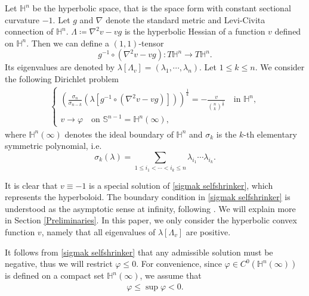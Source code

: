 \documentclass[reqno]{amsart}
\theoremstyle{remark}
\theoremstyle{definition}
\numberwithin{equation}{section}
\begin{document}
Let $\mathbb{H}^n$ be the hyperbolic space, that is the space form with constant sectional curvature $-1$. Let $g$ and $\nabla$ denote the standard metric and Levi-Civita connection of $\mathbb{H}^n$. $\Lambda \coloneqq \nabla^2 v - vg$ is the hyperbolic Hessian of a function $v$ defined on $\mathbb{H}^n$. Then we can define a $(1,1)$-tensor
\[
g^{-1} \circ \left( \nabla^2 v - vg \right) : T\mathbb{H}^n \to T\mathbb{H}^n. 
\]
Its eigenvalues are denoted by $\lambda \left[ \Lambda_v \right] = (\lambda_1, \cdots, \lambda_n)$. Let $1 \leqslant k \leqslant n$.
We consider the following Dirichlet problem
\begin{align}
  \begin{cases}
      \left( \frac{\sigma_n}{\sigma_{n-k}} \left( \lambda \left[ g^{-1} \circ \left( \nabla^2 v - vg \right) \right] \right) \right)^{\frac{1}{k}} = -\frac{v}{\binom{n}{k}^{\frac{1}{k}}} \quad \text{in } \mathbb{H}^{n}, \\
      v \rightarrow \varphi \quad \text{on } \mathbb{S}^{n-1}=\mathbb{H}^{n}(\infty), \label{sigmak selfshrinker}
  \end{cases}
\end{align}
where $\mathbb{H}^n(\infty)$ denotes the ideal boundary of $\mathbb{H}^n$ and $\sigma_k$ is the $k$-th elementary symmetric polynomial, i.e.
\[
\sigma_k(\lambda) = \sum_{1 \leqslant i_1 < \cdots < i_k \leqslant n} \lambda_{i_1}\cdots \lambda_{i_k}.
\]

It is clear that $v \equiv -1$ is a special solution of \eqref{sigmak selfshrinker}, which represents the hyperboloid. The boundary condition in \eqref{sigmak selfshrinker} is understood as the asymptotic sense at infinity, following \cite{Choi}. We will explain more in Section \ref{Preliminaries}. In this paper, we only consider the hyperbolic convex function $v$, namely that all eigenvalues of $\lambda[\Lambda_v]$ are positive. 

It follows from \eqref{sigmak selfshrinker} that any admissible
solution must be negative, thus we will restrict $\varphi \leqslant 0$. For convenience, since $\varphi \in C^{0}(\mathbb{H}^{n}(\infty))$ is defined on a compact set $\mathbb{H}^{n}(\infty)$, we assume that 
\begin{align}
    \varphi \leqslant \sup \varphi < 0. 
\end{align}
\end{document}
